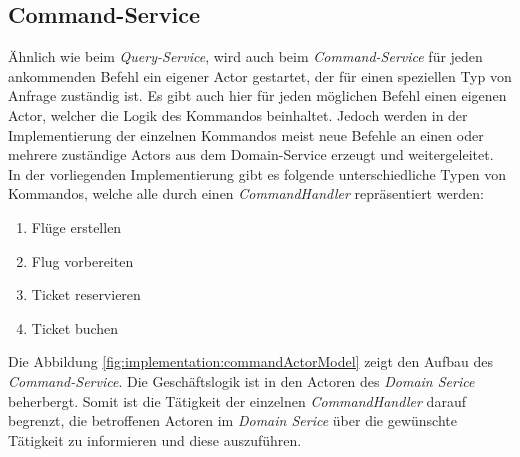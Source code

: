 \subsection{Command-Service}
\label{subsec:implementation:commandService}
 Ähnlich wie beim \textit{Query-Service}, wird auch beim \textit{Command-Service} für jeden ankommenden Befehl ein eigener Actor gestartet, der für einen speziellen Typ von Anfrage zuständig ist. Es gibt auch hier für jeden möglichen Befehl einen eigenen Actor, welcher die Logik des Kommandos beinhaltet. Jedoch werden in der Implementierung der einzelnen Kommandos meist neue Befehle an einen oder mehrere zuständige Actors aus dem Domain-Service erzeugt und weitergeleitet. \\
% 
% 
% 
% 
 In der vorliegenden Implementierung gibt es folgende unterschiedliche Typen von Kommandos, welche alle durch einen \textit{CommandHandler} repräsentiert werden:
 \begin{enumerate}
     \item Flüge erstellen
     \item Flug vorbereiten
     \item Ticket reservieren
     \item Ticket buchen
 \end{enumerate}
Die Abbildung \ref{fig:implementation:commandActorModel} zeigt den Aufbau des \textit{Command-Service}. Die  Geschäftslogik ist  in den Actoren des \textit{Domain Serice} beherbergt. Somit ist die Tätigkeit der einzelnen \textit{CommandHandler} darauf begrenzt, die betroffenen Actoren im \textit{Domain Serice} über die gewünschte Tätigkeit zu informieren und diese  auszuführen. 
